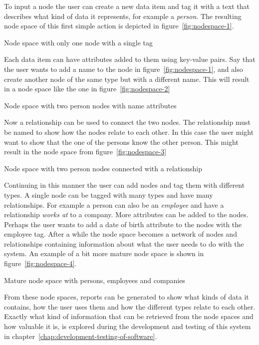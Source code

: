 \documentclass[a4paper]{report}
\begin{document}
To input a node the user can create a new data item and tag it with a text that describes what kind of data it represents, for example a \emph{person}. The resulting node space of this first simple action is depicted in figure~\ref{fig:nodespace-1}.

	{Node space with only one node with a single tag}

Each data item can have attributes added to them using key-value pairs. Say that the user wants to add a name to the node in figure~\ref{fig:nodespace-1}, and also create another node of the same type but with a different name. This will result in a node space like the one in figure~\ref{fig:nodespace-2}

	{Node space with two person nodes with name attributes}

Now a relationship can be used to connect the two nodes. The relationship must be named to show how the nodes relate to each other. In this case the user might want to show that the one of the persons know the other person. This might result in the node space from figure~\ref{fig:nodespace-3}

	{Node space with two person nodes connected with a relationship}

Continuing in this manner the user can add nodes and tag them with different types. A single node can be tagged with many types and have many relationships. For example a person can also be an \emph{employee} and have a relationship \emph{works at} to a company. More attributes can be added to the nodes. Perhaps the user wants to add a date of birth attribute to the nodes with the employee tag. After a while the node space becomes a network of nodes and relationships containing information about what the user needs to do with the system. An example of a bit more mature node space is shown in figure~\ref{fig:nodespace-4}. 

	{Mature node space with persons, employees and companies}

From these node spaces, reports can be generated to show what kinds of data it contains, how the user uses them and how the different types relate to each other. Exactly what kind of information that can be retrieved from the node spaces and how valuable it is, is explored during the development and testing of this system in chapter~\ref{chap:development-testing-of-software}.
\end{document}
